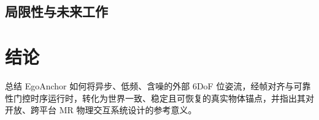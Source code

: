 \documentclass[review]{vgtc}
\begin{document}
\subsection{局限性与未来工作}

\section{结论}
总结 EgoAnchor 如何将异步、低频、含噪的外部 6DoF 位姿流，经帧对齐与可靠性门控时序运行时，转化为世界一致、稳定且可恢复的真实物体锚点，并指出其对开放、跨平台 MR 物理交互系统设计的参考意义。

\nocite{*}


\end{document}
